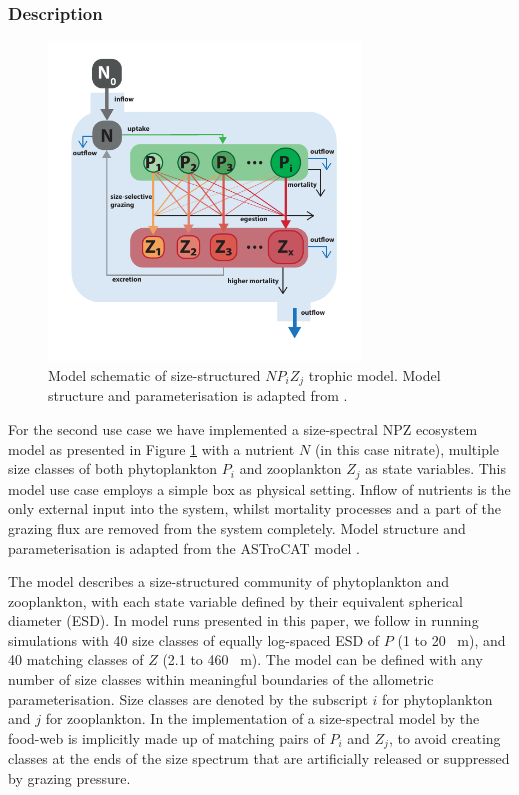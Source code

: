 \documentclass[journal abbreviation, manuscript]{copernicus}
\begin{document}
\subsubsection{Description}
\begin{figure}[t]
\includegraphics[width=8.3cm]{Figures/firstdraft_schematics/03_schematics_ASTroCAT.pdf}
\caption{Model schematic of size-structured $NP_{i}Z_{j}$ trophic model. Model structure and parameterisation is adapted from \citet{Banas2011b}.}
\label{Figure:ModelSchematics_3}
\end{figure}

For the second use case we have implemented a size-spectral NPZ ecosystem model as presented in Figure \ref{Figure:ModelSchematics_3} with a nutrient $N$ (in this case nitrate), multiple size classes of both phytoplankton $P_i$ and zooplankton $Z_j$ as state variables. 
This model use case employs a simple box as physical setting. Inflow of nutrients is the only external input into the system, whilst mortality processes and a part of the grazing flux are removed from the system completely.
Model structure and parameterisation is adapted from the ASTroCAT model \citep{Banas2011b}.

The model describes a size-structured community of phytoplankton and zooplankton, with each state variable defined by their equivalent spherical diameter (ESD). In model runs presented in this paper, we follow \citet{Banas2011b} in running simulations with 40 size classes of equally log-spaced ESD of $P$ (1 to 20 \unit{\mu m}), and 40 matching classes of $Z$ (2.1 to 460  \unit{\mu m}). 
The model can be defined with any number of size classes within meaningful boundaries of the allometric parameterisation. Size classes are denoted by the subscript $i$ for phytoplankton and $j$ for zooplankton. In the implementation of a size-spectral model by \citeauthor{Banas2011b} the food-web is implicitly made up of matching pairs of $P_i$ and $Z_j$, to avoid creating classes at the ends of the size spectrum that are artificially released or suppressed by grazing pressure.
\end{document}
